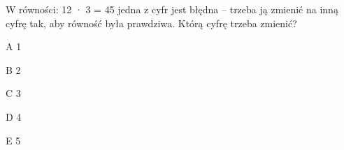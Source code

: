 \begin{tresc}
W równości: 12 · 3 = 45 jedna z cyfr jest błędna – trzeba ją zmienić na inną cyfrę tak, aby równość była prawdziwa. Którą cyfrę trzeba zmienić?
\end{tresc}
\begin{wariant}{A} 1 \end{wariant}
\begin{wariant}{B} 2 \end{wariant}
\begin{wariant}{C} 3 \end{wariant}
\begin{wariant}{D} 4 \end{wariant}
\begin{wariant}{E} 5 \end{wariant}
